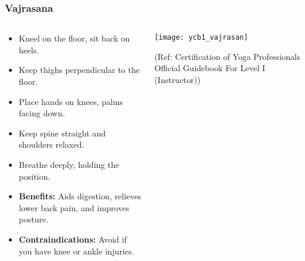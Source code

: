 \begin{frame}[fragile]\frametitle{Vajrasana}
\begin{columns}
    \begin{column}[T]{0.5\linewidth}
      \begin{itemize}
        \item Kneel on the floor, sit back on heels.
        \item Keep thighs perpendicular to the floor.
        \item Place hands on knees, palms facing down.
        \item Keep spine straight and shoulders relaxed.
        \item Breathe deeply, holding the position.
        \item \textbf{Benefits:} Aids digestion, relieves lower back pain, and improves posture.
        \item \textbf{Contraindications:} Avoid if you have knee or ankle injuries.
      \end{itemize}
    \end{column}
    \begin{column}[T]{0.5\linewidth}
        \begin{center}
        \begin{center}
		        \texttt{[image: ycb1\_vajrasan]}
				
				{\tiny (Ref: Certification  of Yoga Professionals Official Guidebook For Level I (Instructor))}	        
		\end{center}   
        \end{center}    
    \end{column}
  \end{columns}
\end{frame}


